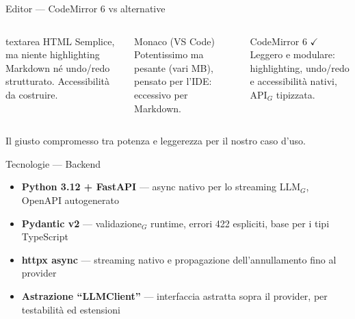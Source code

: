 \documentclass[aspectratio=169,11pt]{beamer}
\newenvironment{scelto}[1]{\begin{alertblock}{#1}}{\end{alertblock}}
\begin{document}
\begin{frame}{Editor --- CodeMirror 6 vs alternative}
  \begin{columns}[T]
    \begin{block}{textarea HTML}
      {\small Semplice, ma niente highlighting Markdown né undo/redo strutturato. Accessibilità da costruire.}
    \end{block}
    \begin{block}{Monaco (VS Code)}
      {\small Potentissimo ma pesante (vari MB), pensato per l'IDE: eccessivo per Markdown.}
    \end{block}
    \begin{scelto}{CodeMirror 6 \ensuremath{\checkmark}}
      {\small Leggero e modulare: highlighting, undo/redo e accessibilità nativi, API$_G$ tipizzata.}
    \end{scelto}
  \end{columns}
  \vspace{6pt}
  \begin{center}
    {\color{sbnavy}\small Il giusto compromesso tra potenza e leggerezza per il nostro caso d'uso.}
  \end{center}
\end{frame}

\begin{frame}{Tecnologie --- Backend}
  \begin{itemize}
    \item \textbf{Python 3.12 + FastAPI} --- async nativo per lo streaming LLM$_G$, OpenAPI autogenerato
    \item \textbf{Pydantic v2} --- validazione$_G$ runtime, errori 422 espliciti, base per i tipi TypeScript
    \item \textbf{httpx async} --- streaming nativo e propagazione dell'annullamento fino al provider
    \item \textbf{Astrazione ``LLMClient''} --- interfaccia astratta sopra il provider, per testabilità ed estensioni
  \end{itemize}
\end{frame}
\end{document}
